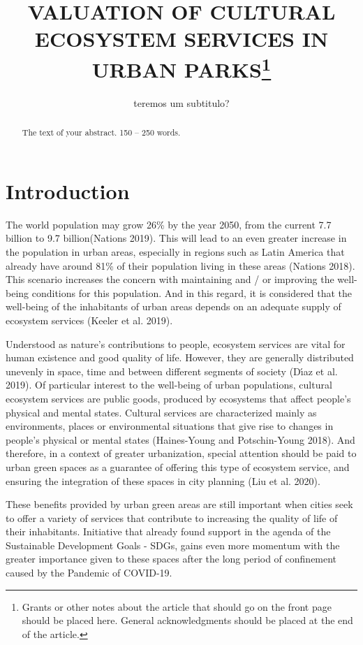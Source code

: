 \documentclass[
]{article}
\title{VALUATION OF CULTURAL ECOSYSTEM SERVICES IN URBAN
PARKS\thanks{Grants or other notes about the article that should go on
the front page should be placed here. General acknowledgments should be
placed at the end of the article.}}
\subtitle{teremos um subtitulo?}
\author{}
\date{\vspace{-2.5em}}
\begin{document}
\maketitle
\begin{abstract}
The text of your abstract. 150 -- 250 words.
\end{abstract}

\hypertarget{intro}{%
\section{Introduction}\label{intro}}

The world population may grow 26\% by the year 2050, from the current
7.7 billion to 9.7 billion(Nations 2019). This will lead to an even
greater increase in the population in urban areas, especially in regions
such as Latin America that already have around 81\% of their population
living in these areas (Nations 2018). This scenario increases the
concern with maintaining and / or improving the well-being conditions
for this population. And in this regard, it is considered that the
well-being of the inhabitants of urban areas depends on an adequate
supply of ecosystem services (Keeler et al. 2019).

Understood as nature's contributions to people, ecosystem services are
vital for human existence and good quality of life. However, they are
generally distributed unevenly in space, time and between different
segments of society (Dı́az et al. 2019). Of particular interest to the
well-being of urban populations, cultural ecosystem services are public
goods, produced by ecosystems that affect people's physical and mental
states. Cultural services are characterized mainly as environments,
places or environmental situations that give rise to changes in people's
physical or mental states (Haines-Young and Potschin-Young 2018). And
therefore, in a context of greater urbanization, special attention
should be paid to urban green spaces as a guarantee of offering this
type of ecosystem service, and ensuring the integration of these spaces
in city planning (Liu et al. 2020).

These benefits provided by urban green areas are still important when
cities seek to offer a variety of services that contribute to increasing
the quality of life of their inhabitants. Initiative that already found
support in the agenda of the Sustainable Development Goals - SDGs, gains
even more momentum with the greater importance given to these spaces
after the long period of confinement caused by the Pandemic of COVID-19.
\end{document}
